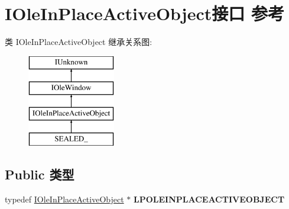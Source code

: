 \hypertarget{interface_i_ole_in_place_active_object}{}\section{I\+Ole\+In\+Place\+Active\+Object接口 参考}
\label{interface_i_ole_in_place_active_object}
类 I\+Ole\+In\+Place\+Active\+Object 继承关系图\+:\begin{figure}[H]
\begin{center}
\leavevmode
\includegraphics[height=4.000000cm]{interface_i_ole_in_place_active_object}
\end{center}
\end{figure}
\subsection*{Public 类型}
\begin{DoxyCompactItemize}
\item 
\mbox{\label{interface_i_ole_in_place_active_object_a4dd484db960122e1b443f550f3b8d733}} 
typedef \hyperlink{interface_i_ole_in_place_active_object}{I\+Ole\+In\+Place\+Active\+Object} $\ast$ {\bfseries L\+P\+O\+L\+E\+I\+N\+P\+L\+A\+C\+E\+A\+C\+T\+I\+V\+E\+O\+B\+J\+E\+CT}
\end{DoxyCompactItemize}

